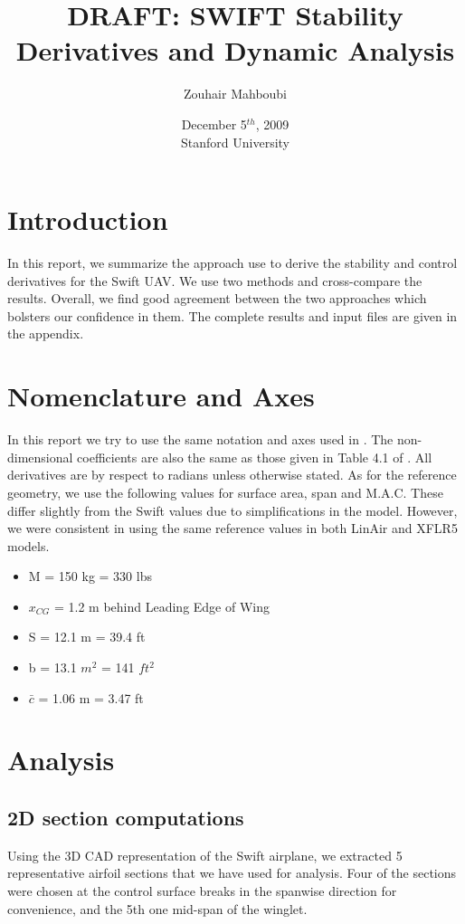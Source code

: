 \documentclass[titlepage,10pt]{article}
\begin{document}
\title{
DRAFT: SWIFT Stability Derivatives and Dynamic Analysis\\
}

\author{Zouhair Mahboubi}

\date{December 5$^{th}$, 2009\\ Stanford University}

\maketitle

\tableofcontents
\newpage
\section{Introduction}
In this report, we summarize the approach use to derive the stability and control derivatives for the Swift UAV. We use two methods and cross-compare the results. Overall, we find good agreement between the two approaches which bolsters our confidence in them. The complete results and input files are given in the appendix.

\section{Nomenclature and Axes}
In this report we try to use the same notation and axes used in \cite{Etkin}. The non-dimensional coefficients are also the same as those given in Table 4.1 of \cite{Etkin}. All derivatives are by respect to radians unless otherwise stated. As for the reference geometry, we use the following values for surface area, span and M.A.C. These differ slightly from the Swift values due to simplifications in the model. However, we were consistent in using the same reference values in both LinAir and XFLR5 models. 
\begin{itemize}
\item M = 150 kg = 330 lbs
\item $x_{CG}$ = 1.2 m behind Leading Edge of Wing
\item S = 12.1 m = 39.4 ft
\item b = 13.1 $m^2$ = 141 $ft^2$
\item $\bar{c}$ = 1.06 m = 3.47 ft
\end{itemize}

\section{Analysis}
\subsection{2D section computations}
Using the 3D CAD representation of the Swift airplane, we extracted 5 representative airfoil sections that we have used for analysis. Four of the sections were chosen at the control surface breaks in the spanwise direction for convenience, and the 5th one mid-span of the winglet.\\
\end{document}
